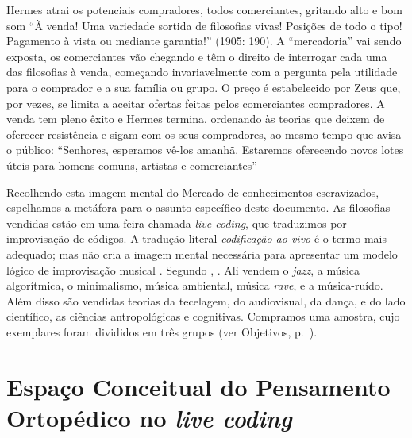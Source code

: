 \begin{citacao}
Hermes atrai os potenciais compradores, todos comerciantes, gritando alto e bom som “À venda! Uma variedade sortida de filosofias vivas! Posições de todo o tipo! Pagamento à vista ou mediante garantia!” (1905: 190). A “mercadoria” vai sendo exposta, os comerciantes vão chegando e têm o direito de interrogar cada uma das filosofias à venda, começando invariavelmente com a pergunta pela utilidade para o comprador e a sua família ou grupo. O preço é estabelecido por Zeus que, por vezes, se limita a aceitar ofertas feitas pelos comerciantes compradores. A venda tem pleno êxito e Hermes termina, ordenando às teorias que deixem de oferecer resistência e sigam com os seus compradores, ao mesmo tempo que avisa o público: “Senhores, esperamos vê-los amanhã. Estaremos oferecendo novos lotes úteis para homens comuns, artistas e comerciantes”   
\end{citacao}

Recolhendo esta imagem mental do Mercado de conhecimentos escravizados, espelhamos a metáfora para o assunto específico deste documento. As filosofias vendidas estão em uma feira chamada \emph{live coding}, que traduzimos por  improvisação de códigos. A tradução literal \emph{codificação ao vivo} é o termo mais adequado; mas não cria a imagem mental necessária para apresentar um modelo lógico de improvisação musical . Segundo , . Ali vendem o \emph{jazz}, a música algorítmica, o minimalismo, música ambiental, música \emph{rave}, e a música-ruído. Além disso são vendidas teorias da tecelagem, do audiovisual, da dança, e do lado científico, as ciências antropológicas e cognitivas. Compramos uma amostra, cujo exemplares foram divididos em três grupos (ver Objetivos, p.~\pageref{sec:objetivos}).


\section*{Espaço Conceitual do Pensamento Ortopédico no \emph{live coding}}

